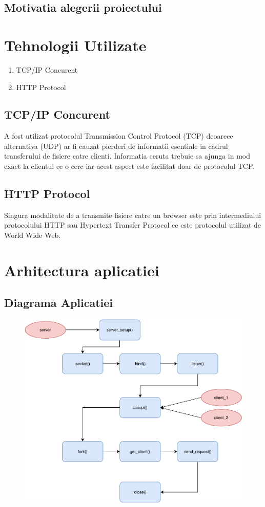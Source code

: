 \documentclass{llncs}
\begin{document}
\subsection{Motivatia alegerii proiectului}





\section{Tehnologii Utilizate}
\begin{enumerate}
  \item TCP/IP Concurent
  \item HTTP Protocol
\end{enumerate}
\subsection{TCP/IP Concurent}
A fost utilizat protocolul Transmission Control Protocol (TCP) deoarece
alternativa (UDP) ar fi cauzat pierderi de informatii esentiale
in cadrul transferului de fisiere catre clienti.
Informatia ceruta trebuie sa ajunga in mod exact la clientul ce o cere
iar acest aspect este facilitat doar de protocolul TCP.
\subsection{HTTP Protocol}
Singura modalitate de a transmite fisiere catre un browser este
prin intermediului protocolului HTTP sau
Hypertext Transfer Protocol ce este protocolul utilizat de World Wide Web.





\section{Arhitectura aplicatiei}
\subsection{Diagrama Aplicatiei}
\begin{figure}
\includegraphics[width=\textwidth]{diagram.pdf}
\end{figure}
\end{document}
